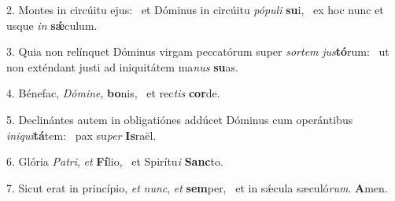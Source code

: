 2. Montes in circúitu ejus: \dag\  et Dóminus in circúitu \textit{pó}\textit{pu}\textit{li} \textbf{su}i, \ast\  ex hoc nunc et usque \textit{in} \textbf{sǽ}culum.\

3. Quia non relínquet Dóminus virgam peccatórum super \textit{sor}\textit{tem} \textit{jus}\textbf{tó}rum: \ast\  ut non exténdant justi ad iniquitátem ma\textit{nus} \textbf{su}as.\

4. Bénefac, \textit{Dó}\textit{mi}\textit{ne}, \textbf{bo}nis, \ast\  et rec\textit{tis} \textbf{cor}de.\

5. Declinántes autem in obligatiónes addúcet Dóminus cum operántibus \textit{in}\textit{i}\textit{qui}\textbf{tá}tem: \ast\  pax su\textit{per} \textbf{Is}raël.\

6. Glória \textit{Pa}\textit{tri}, \textit{et} \textbf{Fí}lio, \ast\  et Spirítu\textit{i} \textbf{Sanc}to.\

7. Sicut erat in princípio, \textit{et} \textit{nunc}, \textit{et} \textbf{sem}per, \ast\  et in sǽcula sæculó\textit{rum}. \textbf{A}men.\

